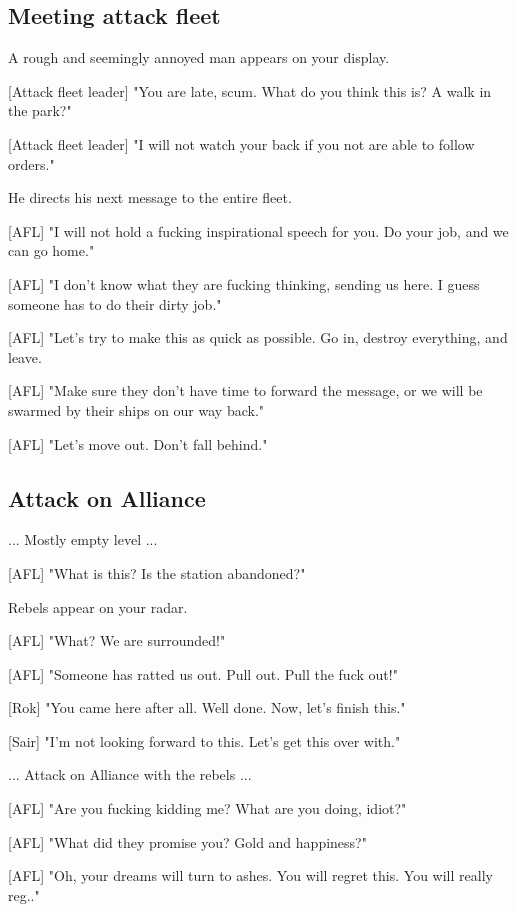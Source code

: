 \documentclass[a4paper,12pt]{article}
\begin{document}
\subsection{Meeting attack fleet}

A rough and seemingly annoyed man appears on your display.

[Attack fleet leader] "You are late, scum. What do you think this is? A walk in the park?"

[Attack fleet leader] "I will not watch your back if you not are able to follow orders."

He directs his next message to the entire fleet.

[AFL] "I will not hold a fucking inspirational speech for you. Do your job,
and we can go home." 

[AFL] "I don't know what they are fucking thinking, sending us here. I guess someone has to do their dirty job."

[AFL] "Let's try to make this as quick as possible. Go in, destroy everything,
and leave.

[AFL] "Make sure they don't have time to forward the message, or we will be swarmed by their ships on our way back."

[AFL] "Let's move out. Don't fall behind."

\subsection{Attack on Alliance}

... Mostly empty level ...

[AFL] "What is this? Is the station abandoned?"

Rebels appear on your radar.

[AFL] "What? We are surrounded!" 

[AFL] "Someone has ratted us out. Pull out. Pull the fuck out!"

[Rok] "You came here after all. Well done. Now, let's finish this."

[Sair] "I'm not looking forward to this. Let's get this over with."

... Attack on Alliance with the rebels ...

[AFL] "Are you fucking kidding me? What are you doing, idiot?"

[AFL] "What did they promise you? Gold and happiness?" 

[AFL] "Oh, your dreams will turn to ashes. You will regret this. You will really reg.."
\end{document}
